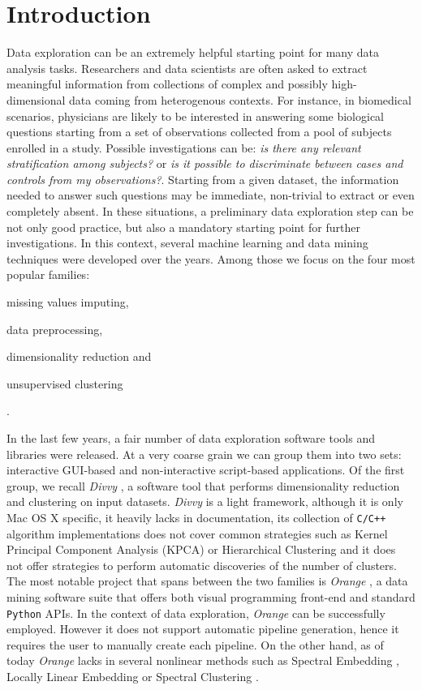 \documentclass[twoside,11pt]{article}
\makeatletter
\newcommand{\py}{\texttt{Python}\@\xspace}
\makeatother
\begin{document}
\section{Introduction}\label{sec:intro}
Data exploration can be an extremely helpful starting point for many data analysis tasks. Researchers and data scientists are often asked to extract meaningful information from collections of complex and possibly high-dimensional data coming from heterogenous contexts. For instance, in biomedical scenarios, physicians are likely to be interested in answering some biological questions starting from a set of observations collected from a pool of subjects enrolled in a study. Possible investigations can be: \emph{is there any relevant stratification among subjects?} or \emph{is it possible to discriminate between cases and controls from my observations?}. Starting from a given dataset, the information needed to answer such questions may be immediate, non-trivial to extract or even completely absent.
In these situations, a preliminary data exploration step can be not only good practice, but also a mandatory starting point for further investigations. In this context, several machine learning and data mining techniques were developed over the years. Among those we focus on the four most popular families: \begin{enumerate*}[label=(\roman*)]
  \item missing values imputing,
  \item data preprocessing,
  \item dimensionality reduction and
  \item unsupervised clustering
\end{enumerate*}.

In the last few years, a fair number of data exploration software tools and libraries  were released. At a very coarse grain we can group them into two sets: interactive GUI-based and non-interactive script-based  applications. Of the first group, we recall \emph{Divvy} \citep{lewis2013divvy}, a software tool that performs dimensionality reduction and clustering on input datasets. \emph{Divvy} is a light framework, although it is only Mac OS X specific, it heavily lacks in documentation, its collection of \texttt{C/C++} algorithm implementations does not cover common strategies such as Kernel Principal Component Analysis (KPCA) \citep{scholkopf1997kernel} or Hierarchical Clustering \citep{friedman2001elements} and it does not offer strategies to perform automatic discoveries of the number of clusters. The most notable project that spans between the two families is \emph{Orange} \citep{demvsar2013orange}, a data mining software suite that offers both visual programming front-end and standard \py APIs. In the context of data exploration, \emph{Orange} can be successfully employed. However it does not support automatic pipeline generation, hence it requires the user to manually create each pipeline. On the other hand, as of today \emph{Orange} lacks in several nonlinear methods such as Spectral Embedding \citep{ng2002spectral}, Locally Linear Embedding \citep{roweis2000nonlinear} or Spectral Clustering \citep{shi2000normalized}.
\end{document}
